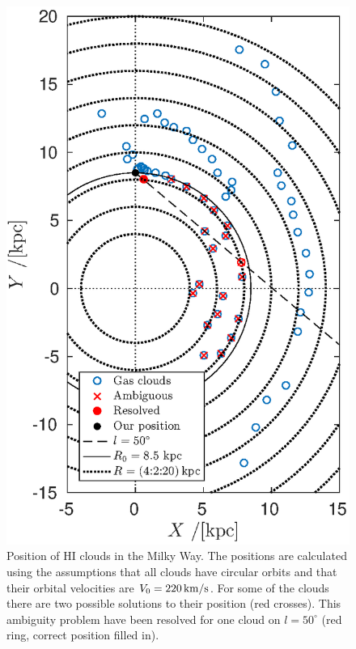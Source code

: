 \documentclass[11pt,a4paper, twocolumn,
swedish, english %
]{article}
\begin{document}
\begin{figure}\centering
\includegraphics[width=1\linewidth]{gas_clouds.eps}
\caption{Position of HI clouds in the Milky Way. The positions are
  calculated using the assumptions that all clouds have circular
  orbits and that their orbital velocities are
  $V_0=\unit[220]{km/s}$. For some of the clouds there are two
  possible solutions to their position (red crosses). This ambiguity
  problem have been resolved for one cloud on $l=50^\circ$ (red ring,
  correct position filled in). }
\label{fig:clouds}
\end{figure}
\end{document}
